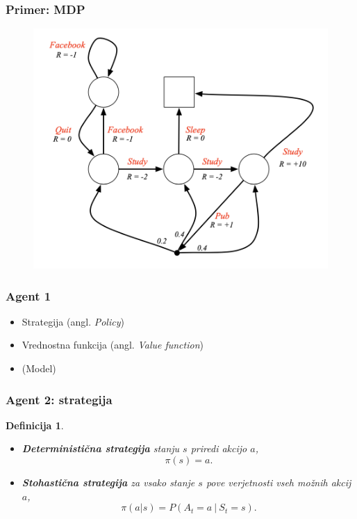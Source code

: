 \documentclass{beamer}    %
\newtheorem{definicija}[izrek]{Definicija}
\begin{document}
\begin{frame}
    \frametitle{Primer: MDP}
    \begin{figure}[b]
        \includegraphics[scale=0.6]{slike/mdp.png}
    \end{figure}
\end{frame}


\begin{frame}
    \frametitle{Agent 1}
    \begin{itemize}
        \item Strategija (angl. \textit{Policy})
        \item Vrednostna funkcija (angl. \textit{Value function})
        \item (Model)
    \end{itemize}
\end{frame}


\begin{frame}
    \frametitle{Agent 2: strategija}
    \begin{definicija}
        \begin{itemize}
            \item \textbf{Deterministična strategija} stanju $s$ priredi akcijo $a$, 
                    $$
                    \pi(s) = a.
                    $$ 
            \item \textbf{Stohastična strategija} za vsako stanje $s$ pove verjetnosti vseh 
                    možnih akcij $a$, 
                    $$
                    \pi(a | s) = P(A_t = a~|~S_t = s).
                    $$
        \end{itemize}
    \end{definicija}
\end{frame}
\end{document}
